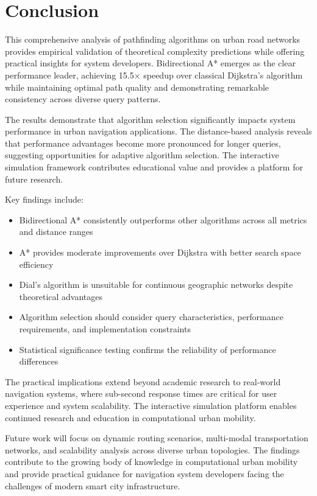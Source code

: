 \documentclass[conference]{IEEEtran}
\begin{document}
\section{Conclusion}

This comprehensive analysis of pathfinding algorithms on urban road networks provides empirical validation of theoretical complexity predictions while offering practical insights for system developers. Bidirectional A* emerges as the clear performance leader, achieving 15.5× speedup over classical Dijkstra's algorithm while maintaining optimal path quality and demonstrating remarkable consistency across diverse query patterns.

The results demonstrate that algorithm selection significantly impacts system performance in urban navigation applications. The distance-based analysis reveals that performance advantages become more pronounced for longer queries, suggesting opportunities for adaptive algorithm selection. The interactive simulation framework contributes educational value and provides a platform for future research.

Key findings include:
\begin{itemize}
\item Bidirectional A* consistently outperforms other algorithms across all metrics and distance ranges
\item A* provides moderate improvements over Dijkstra with better search space efficiency
\item Dial's algorithm is unsuitable for continuous geographic networks despite theoretical advantages
\item Algorithm selection should consider query characteristics, performance requirements, and implementation constraints
\item Statistical significance testing confirms the reliability of performance differences
\end{itemize}

The practical implications extend beyond academic research to real-world navigation systems, where sub-second response times are critical for user experience and system scalability. The interactive simulation platform enables continued research and education in computational urban mobility.

Future work will focus on dynamic routing scenarios, multi-modal transportation networks, and scalability analysis across diverse urban topologies. The findings contribute to the growing body of knowledge in computational urban mobility and provide practical guidance for navigation system developers facing the challenges of modern smart city infrastructure.
\end{document}
